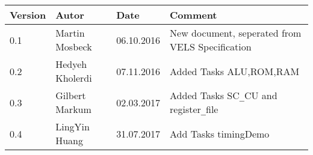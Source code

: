 
\begin{table}[h]
\begin{tabular*}{14.7cm}{|p{}|p{}|p{2cm}|p{}|}
\hline 
Version & Autor & Date & Comment \\[2pt]
\hline
\hline
0.1 & Martin Mosbeck & 06.10.2016& New document, seperated from VELS Specification \\[2pt]
\hline
0.2 & Hedyeh Kholerdi & 07.11.2016& Added Tasks ALU,ROM,RAM \\[2pt]
\hline
0.3 & Gilbert Markum & 02.03.2017 & Added Tasks SC\verb!_!CU and register\verb!_!file \\[2pt]
\hline
0.4 & LingYin Huang & 31.07.2017 & Add Tasks timingDemo \\ [2pt]
\hline
\end{tabular*}
\end{table}

